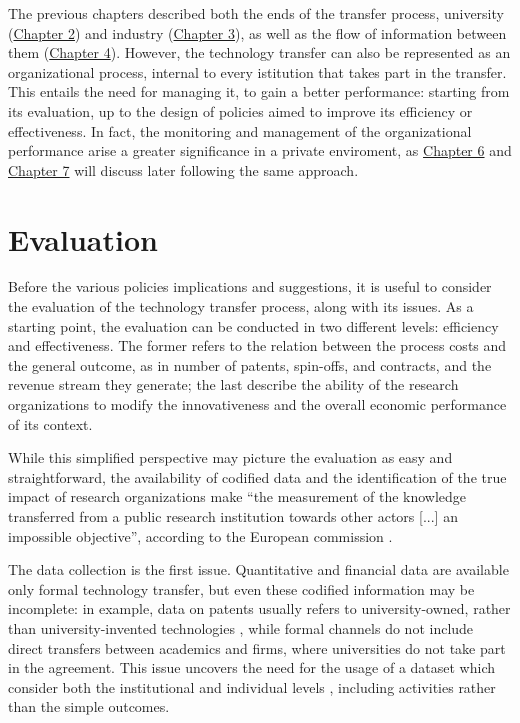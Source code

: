 

\label{Chapter5} %

The previous chapters described both the ends of the transfer process, university (\hyperref[Chapter2]{Chapter 2}) and industry (\hyperref[Chapter3]{Chapter 3}), as well as the flow of information between them (\hyperref[Chapter4]{Chapter 4}). However, the technology transfer can also be represented as an organizational process, internal to every istitution that takes part in the transfer. This entails the need for managing it, to gain a better performance: starting from its evaluation, up to the design of policies aimed to improve its efficiency or effectiveness. In fact, the monitoring and management of the organizational performance arise a greater significance in a private enviroment, as \hyperref[Chapter6]{Chapter 6} and \hyperref[Chapter7]{Chapter 7} will discuss later following the same approach.

\section{Evaluation}

Before the various policies implications and suggestions, it is useful to consider the evaluation of the technology transfer process, along with its issues. As a starting point, the evaluation can be conducted in two different levels: efficiency and effectiveness. The former refers to the relation between the process costs and the general outcome, as in number of patents, spin-offs, and contracts, and the revenue stream they generate; the last describe the ability of the research organizations to modify the innovativeness and the overall economic performance of its context. 

While this simplified perspective may picture the evaluation as easy and straightforward, the availability of codified data and the identification of the true impact of research organizations make \enquote{the measurement of the knowledge transferred from a public research institution towards other actors [...] an impossible objective}, according to the European commission \citep{Balderi2010}. 

The data collection is the first issue. Quantitative and financial data are available only formal technology transfer, but even these codified information may be incomplete: in example, data on patents usually refers to university-owned, rather than university-invented technologies \citep{Geuna2009}, while formal channels do not include direct transfers between academics and firms, where universities do not take part in the agreement. This issue uncovers the need for the usage of a dataset which consider both the institutional and individual levels \citep{Wong2010}, including activities rather than the simple outcomes. 

